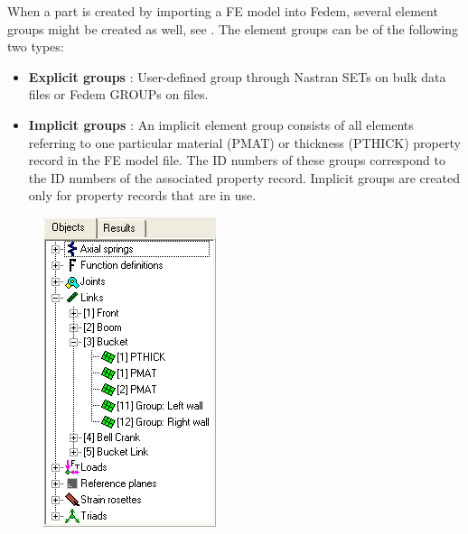\clearpage





When a part is created by importing a FE model into Fedem,
several element groups might be created as well, see
.
The element groups can be of the following two types:

\begin{itemize}
\item
  \textbf{Explicit groups} : User-defined group through Nastran SETs on
  bulk data files or Fedem GROUPs on  files.
\item
  \textbf{Implicit groups} : An implicit element group consists of all
  elements referring to one particular material (PMAT) or thickness
  (PTHICK) property record in the FE model file. The ID numbers of these
  groups correspond to the ID numbers of the associated property record.
  Implicit groups are created only for property records that are in use.
\end{itemize}


\begin{figure}
  \includegraphics[trim=0 75 0 0,clip,scale=0.5]{Figures/4-ElementGroups}
\end{figure}

